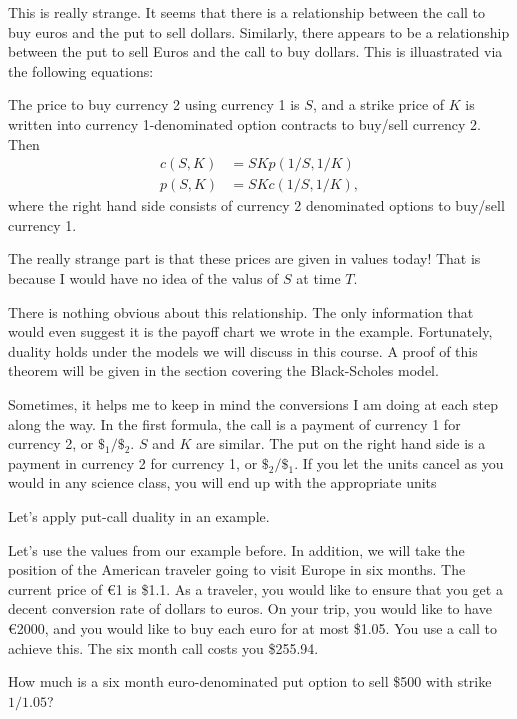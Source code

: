 \documentclass{ximera}
\begin{document}
This is really strange. It seems that there is a relationship between the call to buy euros and the put to sell dollars. Similarly, there appears to be a relationship between the put to sell Euros and the call to buy dollars. This is illuastrated via the following equations:

\begin{theorem} The price to buy currency 2 using currency 1 is $S$, and a strike price of $K$ is written into currency 1-denominated option contracts to buy/sell currency 2. Then
	\begin{align*}
	c(S,K)&=SKp(1/S, 1/K)\\
	p(S,K)&=SKc(1/S, 1/K),
	\end{align*}
where the right hand side consists of currency 2 denominated options to buy/sell currency 1. 
\end{theorem}

The really strange part is that these prices are given in values today! That is because I would have no idea of the valus of $S$ at time $T$.

There is nothing obvious about this relationship. The only information that would even suggest it is the payoff chart we wrote in the example. Fortunately, duality holds under the models we will discuss in this course. A proof of this theorem will be given in the section covering the Black-Scholes model. 

Sometimes, it helps me to keep in mind the conversions I am doing at each step along the way. In the first formula, the call is a payment of currency 1 for currency 2, or $\$_1/\$_2$. $S$ and $K$ are similar. The put on the right hand side is a payment in currency 2 for currency 1, or $\$_2/\$_1$. If you let the units cancel as you would in any science class, you will end up with the appropriate units

Let's apply put-call duality in an example.

\begin{example}
Let's use the values from our example before. In addition, we will take the position of the American traveler going to visit Europe in six months. The current price of \euro{1} is \$1.1. As a traveler, you would like to ensure that you get a decent conversion rate of dollars to euros. On your trip, you would like to have \euro{2000}, and you would like to buy each euro for at most \$1.05. You use a call to achieve this. The six month call costs you \$255.94. 

How much is a six month euro-denominated put option to sell \$500 with strike $1/1.05$?
\end{example}
\end{document}
